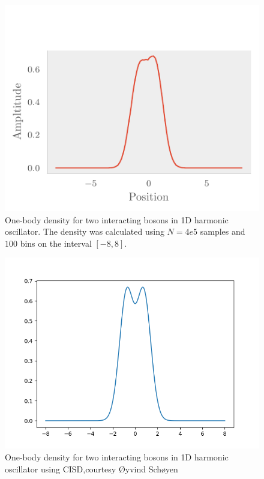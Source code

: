 \begin{figure}[H]
	\includegraphics[]{figures/many_part_int_onebody.pdf}
	\caption{One-body density for two interacting bosons in 1D harmonic oscillator. The density was calculated using $N=4e5$ samples and $100$ bins on the interval $[-8,8]$.}
	\label{fig:many_part_int_onebody}
\end{figure}

\begin{figure}[H]
	\includegraphics[scale = 0.4]{figures/oyvind.png}
	\caption{One-body density for two interacting bosons in 1D harmonic oscillator using CISD,courtesy Øyvind Schøyen}
	\label{fig:onebody_oyvind}
\end{figure}


